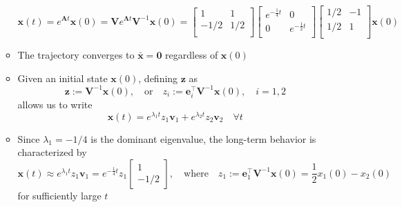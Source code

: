 \documentclass[12pt,a4paper]{article}
\begin{document}
\begin{itemize}
\begin{itemize}
\begin{equation}
        \bm{x}(t) =
        e^{\bm{A}t}\bm{x}(0)
        =
        \bm{V}e^{\bm{\Lambda}t}\bm{V}^{-1}\bm{x}(0)
        =
      \begin{bmatrix}
        1 & 1 \\
        -1/2 & 1/2 \\
      \end{bmatrix}
      \begin{bmatrix}
        e^{- \frac{1}{4}t} & 0 \\
        0 & e^{- \frac{1}{2}t} \\
      \end{bmatrix}
      \begin{bmatrix}
        1/2 & -1 \\
        1/2 & 1 \\
      \end{bmatrix}
      \bm{x}(0)
      \end{equation}
    \item The trajectory converges to $\bar{\bm{x}}=\bm{0}$
      regardless of $\bm{x}(0)$
    \item Given an initial state $\bm{x}(0)$,
      defining $\bm{z}$ as
      \begin{equation}\nonumber%
        \bm{z} := \bm{V}^{-1}\bm{x}(0),
        \quad\text{or}\quad
        z_{i} := \bm{e}_{i}^{\top}\bm{V}^{-1}\bm{x}(0),
        \quad i = 1, 2
      \end{equation}
      allows us to write
    \begin{equation}\nonumber%
      \bm{x}(t)
      =
      e^{\lambda_{1}t}z_{1}\bm{v}_{1}
      +
      e^{\lambda_{2}t}z_{2}\bm{v}_{2}
      \quad \forall t
    \end{equation}
    \item Since $\lambda_{1}=-1/4$ is the dominant eigenvalue,
      the long-term behavior is characterized by
    \begin{equation}\nonumber%
      \bm{x}(t)
      \approx
      e^{\lambda_{1}t}z_{1}\bm{v}_{1}
      =
      e^{- \frac{1}{4}t}z_{1}
      \begin{bmatrix}
        1 \\ -1/2
      \end{bmatrix},
      \quad\text{where}\quad
      z_{1}:=\bm{e}_{1}^{\top}\bm{V}^{-1}\bm{x}(0)
      = \frac{1}{2}x_{1}(0) - x_{2}(0)
    \end{equation}
    for sufficiently large $t$
  \end{itemize}


\end{itemize}
\end{document}
